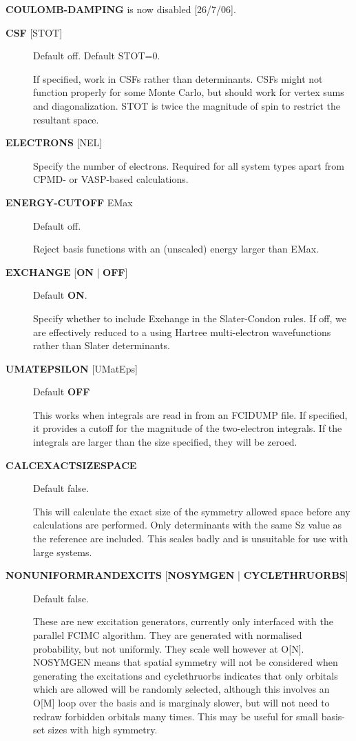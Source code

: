 \documentclass[openany,a4paper,10pt]{manual}
\begin{document}
\begin{notice}[note]
\textbf{COULOMB-DAMPING} is now disabled {[}26/7/06{]}.
\end{notice}
\begin{description}
\item[\textbf{CSF} {[}STOT{]}]
Default off.  Default STOT=0.

If specified, work in CSFs rather than determinants.  CSFs might not
function properly for some Monte Carlo, but should work for vertex
sums and diagonalization.   STOT is twice the magnitude of spin to
restrict the resultant space.

\item[\textbf{ELECTRONS} {[}NEL{]}]
Specify the number of electrons.  Required for all system types
apart from CPMD- or VASP-based  calculations.

\item[\textbf{ENERGY-CUTOFF} EMax]
Default off.

Reject basis functions with an (unscaled) energy larger than EMax.

\item[\textbf{EXCHANGE} {[}\textbf{ON} | \textbf{OFF}{]}]
Default \textbf{ON}.

Specify whether to include Exchange in the Slater-Condon rules.
If off, we are effectively reduced to a using Hartree multi-electron
wavefunctions rather than Slater determinants.

\item[\textbf{UMATEPSILON} {[}UMatEps{]}]
Default \textbf{OFF}

This works when integrals are read in from an FCIDUMP file. If specified, it provides
a cutoff for the magnitude of the two-electron integrals. If the integrals are larger
than the size specified, they will be zeroed.

\item[\textbf{CALCEXACTSIZESPACE}]
Default false.

This will calculate the exact size of the symmetry allowed space before any calculations
are performed. Only determinants with the same Sz value as the reference are included.
This scales badly and is unsuitable for use with large systems.

\item[\textbf{NONUNIFORMRANDEXCITS} {[}\textbf{NOSYMGEN} | \textbf{CYCLETHRUORBS}{]}]
Default false.

These are new excitation generators, currently only interfaced with the parallel
FCIMC algorithm. They are generated with normalised probability, but not uniformly.
They scale well however at O{[}N{]}. NOSYMGEN means that spatial symmetry will not
be considered when generating the excitations and cyclethruorbs indicates that
only orbitals which are allowed will be randomly selected, although this involves
an O{[}M{]} loop over the basis and is marginaly slower, but will not need to redraw
forbidden orbitals many times. This may be useful for small basis-set sizes with
high symmetry.


\end{description}
\end{document}

